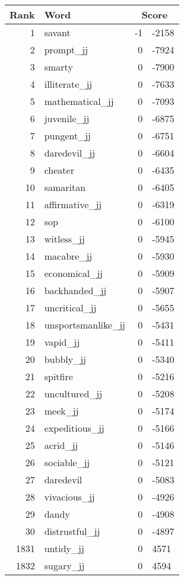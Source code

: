 \begin{longtable}[!htbp]{| rlr@{.}l |}
    \hline
    \textbf{Rank} & \textbf{Word} & \multicolumn{2}{c|}{\textbf{Score}} \\
    \hline
    \endhead
    1 & savant & -1 & -2158 \\
    2 & prompt\_jj & 0 & -7924 \\
    3 & smarty & 0 & -7900 \\
    4 & illiterate\_jj & 0 & -7633 \\
    5 & mathematical\_jj & 0 & -7093 \\
    6 & juvenile\_jj & 0 & -6875 \\
    7 & pungent\_jj & 0 & -6751 \\
    8 & daredevil\_jj & 0 & -6604 \\
    9 & cheater & 0 & -6435 \\
    10 & samaritan & 0 & -6405 \\
    11 & affirmative\_jj & 0 & -6319 \\
    12 & sop & 0 & -6100 \\
    13 & witless\_jj & 0 & -5945 \\
    14 & macabre\_jj & 0 & -5930 \\
    15 & economical\_jj & 0 & -5909 \\
    16 & backhanded\_jj & 0 & -5907 \\
    17 & uncritical\_jj & 0 & -5655 \\
    18 & unsportsmanlike\_jj & 0 & -5431 \\
    19 & vapid\_jj & 0 & -5411 \\
    20 & bubbly\_jj & 0 & -5340 \\
    21 & spitfire & 0 & -5216 \\
    22 & uncultured\_jj & 0 & -5208 \\
    23 & meek\_jj & 0 & -5174 \\
    24 & expeditious\_jj & 0 & -5166 \\
    25 & acrid\_jj & 0 & -5146 \\
    26 & sociable\_jj & 0 & -5121 \\
    27 & daredevil & 0 & -5083 \\
    28 & vivacious\_jj & 0 & -4926 \\
    29 & dandy & 0 & -4908 \\
    30 & distrustful\_jj & 0 & -4897 \\
    1831 & untidy\_jj & 0 & 4571 \\
    1832 & sugary\_jj & 0 & 4594 \\

\end{longtable}

